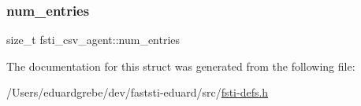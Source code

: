 \mbox{\label{structfsti__csv__agent_aa57cdad849a5aa0fd9a32a4813c0a5a9}} 
\subsubsection{\texorpdfstring{num\+\_\+entries}{num\_entries}}
{\footnotesize\ttfamily size\+\_\+t fsti\+\_\+csv\+\_\+agent\+::num\+\_\+entries}



The documentation for this struct was generated from the following file\+:\begin{DoxyCompactItemize}
\item 
/\+Users/eduardgrebe/dev/faststi-\/eduard/src/\mbox{\hyperlink{fsti-defs_8h}{fsti-\/defs.\+h}}\end{DoxyCompactItemize}

